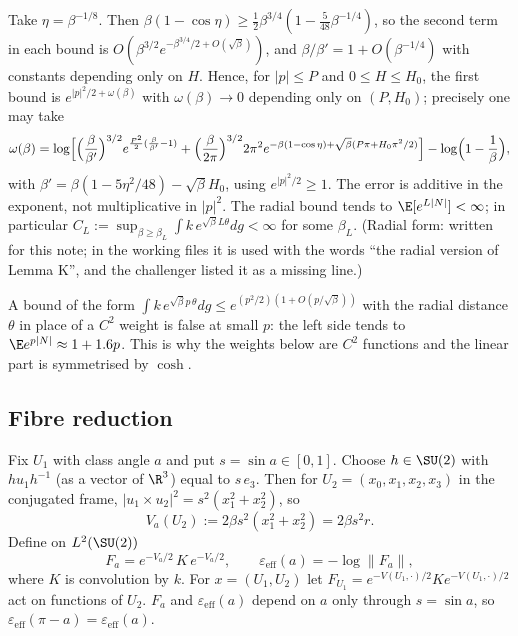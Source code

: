 \begin{remark}\label{tu:U-K-rem}
Take $\eta=\beta^{-1/8}$. Then $\beta(1-\cos\eta)\ge\frac12\beta^{3/4}(1-\frac5{48}\beta^{-1/4})$, so the second
term in each bound is $O(\beta^{3/2}e^{-\beta^{3/4}/2+O(\sqrt\beta)})$, and $\beta/\beta'=1+O(\beta^{-1/4})$ with
constants depending only on $H$. Hence, for $|p|\le P$ and $0\le H\le H_0$, the first bound is
$e^{|p|^2/2+\omega(\beta)}$ with $\omega(\beta)\to0$ depending only on $(P,H_0)$; precisely one may take
\[
\omega(\beta)=\log\Bigl[\Bigl(\frac{\beta}{\beta'}\Bigr)^{3/2}e^{\frac{P^2}{2}(\frac{\beta}{\beta'}-1)}
+\Bigl(\frac{\beta}{2\pi}\Bigr)^{3/2}2\pi^2e^{-\beta(1-\cos\eta)+\sqrt\beta(P\pi+H_0\pi^2/2)}\Bigr]-\log\Bigl(1-\frac1\beta\Bigr),
\]
with $\beta'=\beta(1-5\eta^2/48)-\sqrt\beta H_0$, using $e^{|p|^2/2}\ge1$. The error is additive in the exponent,
not multiplicative in $|p|^2$. The radial bound tends to $\E[e^{L|N|}]<\infty$; in particular
$C_L:=\sup_{\beta\ge\beta_L}\int k\,e^{\sqrt\beta L\theta}dg<\infty$ for some $\beta_L$. (Radial form: written
for this note; in the working files it is used with the words ``the radial version of Lemma K'',
and the challenger listed it as a missing line.)

A bound of the form $\int k\,e^{\sqrt\beta p\,\theta}dg\le e^{(p^2/2)(1+O(p/\sqrt\beta))}$ with the radial distance
$\theta$ in place of a $C^2$ weight is false at small $p$: the left side tends to $\E e^{p|N|}\approx1+1.6p$.
This is why the weights below are $C^2$ functions and the linear part is symmetrised by $\cosh$.
\end{remark}

\subsection{Fibre reduction}

Fix $U_1$ with class angle $a$ and put $s=\sin a\in[0,1]$. Choose $h\in\SU(2)$ with
$hu_1h^{-1}$ (as a vector of $\R^3$) equal to $s\,e_3$. Then for $U_2=(x_0,x_1,x_2,x_3)$ in the conjugated
frame, $|u_1\times u_2|^2=s^2(x_1^2+x_2^2)$, so
\[
V_a(U_2):=2\beta s^2(x_1^2+x_2^2)=2\beta s^2r .
\]
Define on $L^2(\SU(2))$
\[
F_a=e^{-V_a/2}\,K\,e^{-V_a/2},\qquad \varepsilon_{\mathrm{eff}}(a)=-\log\|F_a\|,
\]
where $K$ is convolution by $k$. For $x=(U_1,U_2)$ let $F_{U_1}=e^{-V(U_1,\cdot)/2}Ke^{-V(U_1,\cdot)/2}$ act on
functions of $U_2$. $F_a$ and $\varepsilon_{\mathrm{eff}}(a)$ depend on $a$ only through $s=\sin a$, so
$\varepsilon_{\mathrm{eff}}(\pi-a)=\varepsilon_{\mathrm{eff}}(a)$.

